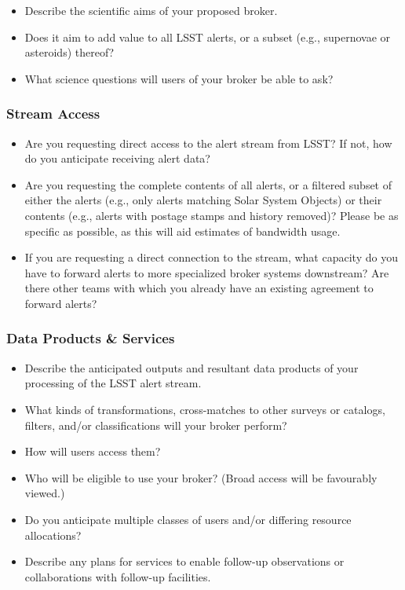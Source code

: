 \documentclass[DM,toc,lsstdraft]{lsstdoc}
\begin{document}
\begin{itemize}
\item Describe the scientific aims of your proposed broker. 
\item Does it aim to add value to all LSST alerts, or a subset (e.g., supernovae or asteroids) thereof?
\item What science questions will users of your broker be able to ask?
\end{itemize}

\subsubsection{Stream Access}

\begin{itemize}
\item Are you requesting direct access to the alert stream from LSST?  If not, how do you anticipate receiving alert data? 
\item Are you requesting the complete contents of all alerts, or a filtered subset of either the alerts (e.g., only alerts matching Solar System Objects) or their contents (e.g., alerts with postage stamps and history removed)?  Please be as specific as possible, as this will aid estimates of bandwidth usage.
\item If you are requesting a direct connection to the stream, what capacity do you have to forward alerts to more specialized broker systems downstream?  Are there other teams with which you already have an existing agreement to forward alerts?
\end{itemize}

\subsubsection{Data Products \& Services}

\begin{itemize}
\item Describe the anticipated outputs and resultant data products of your processing of the LSST alert stream. 
\item What kinds of transformations, cross-matches to other surveys or catalogs, filters, and/or classifications will your broker perform?
\item How will users access them?
\item Who will be eligible to use your broker?  (Broad access will be favourably viewed.)
\item Do you anticipate multiple classes of users and/or differing resource allocations?
\item Describe any plans for services to enable follow-up observations or collaborations with follow-up facilities.
\end{itemize}
\end{document}
